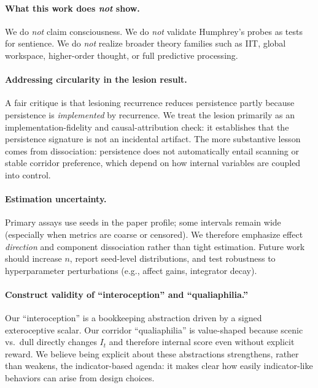 \documentclass[letterpaper]{article} %
\begin{document}
\paragraph{What this work does \emph{not} show.}
We do \emph{not} claim consciousness.
We do \emph{not} validate Humphrey's probes as tests for sentience.
We do \emph{not} realize broader theory families such as IIT, global workspace, higher-order thought, or full predictive processing.

\paragraph{Addressing circularity in the lesion result.}
A fair critique is that lesioning recurrence reduces persistence partly because persistence is \emph{implemented} by recurrence.
We treat the lesion primarily as an implementation-fidelity and causal-attribution check: it establishes that the persistence signature is not an incidental artifact.
The more substantive lesson comes from dissociation: persistence does not automatically entail scanning or stable corridor preference, which depend on how internal variables are coupled into control.

\paragraph{Estimation uncertainty.}
Primary assays use  seeds in the paper profile; some intervals remain wide (especially when metrics are coarse or censored).
We therefore emphasize effect \emph{direction} and component dissociation rather than tight estimation.
Future work should increase $n$, report seed-level distributions, and test robustness to hyperparameter perturbations (e.g., affect gains, integrator decay).

\paragraph{Construct validity of ``interoception'' and ``qualiaphilia.''}
Our ``interoception'' is a bookkeeping abstraction driven by a signed exteroceptive scalar.
Our corridor ``qualiaphilia'' is value-shaped because scenic vs.\ dull directly changes $I_t$ and therefore internal score even without explicit reward.
We believe being explicit about these abstractions strengthens, rather than weakens, the indicator-based agenda: it makes clear how easily indicator-like behaviors can arise from design choices.
\end{document}
